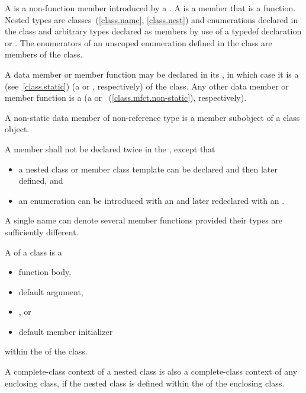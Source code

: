 \pnum
A  is a non-function member introduced by a
.
A  is a member that is a function.
Nested types are classes~(\ref{class.name}, \ref{class.nest}) and
enumerations declared in the class and arbitrary types
declared as members by use of a typedef declaration
or .
The enumerators of an unscoped enumeration defined in the class
are members of the class.

%
%
%
\pnum
A data member or member function
may be declared  in its ,
in which case it is a  (see~\ref{class.static})
(a  or
, respectively)
of the class.
Any other data member or member function is a 
(a  or
~(\ref{class.mfct.non-static}), respectively).
\begin{note}
A non-static data member of non-reference
type is a member subobject of a class object.
\end{note}

\pnum
A member shall not be declared twice in the
, except that
\begin{itemize}
\item a nested class or member
class template can be declared and then later defined, and
\item an
enumeration can be introduced with an  and later
redeclared with an .
\end{itemize}
\begin{note}
A single name can denote several member functions provided their types
are sufficiently different.
\end{note}

\pnum
{}%
A  of a class is a
\begin{itemize}
\item function body,
\item default argument,
\item {}, or
\item default member initializer
\end{itemize}
within the  of the class.
\begin{note}
A complete-class context of a nested class is also a complete-class
context of any enclosing class, if the nested class is defined within
the  of the enclosing class.
\end{note}


